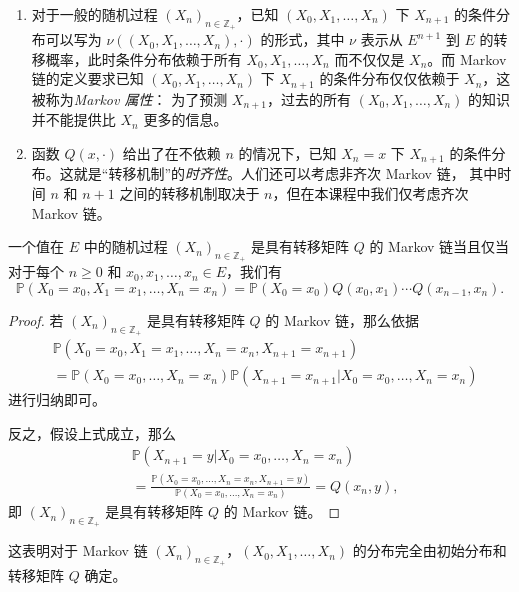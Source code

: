 \documentclass[fontset=none]{Notes}
\begin{document}
\begin{remark}
  \mbox{}
  \begin{enumerate}
    \item 对于一般的随机过程 $(X_n)_{n\in \mathbb{Z}_+}$，已知 $(X_0,X_1,\dots,X_n)$
    下 $X_{n+1}$ 的条件分布可以写为 $\nu((X_0,X_1,\dots,X_n),\cdot)$ 的形式，其中
    $\nu$ 表示从 $E^{n+1}$ 到 $E$ 的转移概率，此时条件分布依赖于所有 $X_0,X_1,\dots,X_n$
    而不仅仅是 $X_n$。而 Markov 链的定义要求已知 $(X_0,X_1,\dots,X_n)$
    下 $X_{n+1}$ 的条件分布仅仅依赖于 $X_n$，这被称为\emph{Markov 属性}：
    为了预测 $X_{n+1}$，过去的所有 $(X_0,X_1,\dots,X_n)$ 的知识并不能提供比 $X_n$
    更多的信息。  
    \item 函数 $Q(x,\cdot)$ 给出了在不依赖 $n$ 的情况下，已知 $X_n=x$ 下 $X_{n+1}$
    的条件分布。这就是“转移机制”的\emph{时齐性}。人们还可以考虑非齐次 Markov 链，
    其中时间 $n$ 和 $n + 1$ 之间的转移机制取决于 $n$，但在本课程中我们仅考虑齐次 Markov 链。
  \end{enumerate}
\end{remark}

\begin{proposition}\label{prop:law of X0 to Xn}
  一个值在 $E$ 中的随机过程 $(X_n)_{n\in \mathbb{Z}_+}$ 是具有转移矩阵 $Q$ 的 Markov 链当且仅当
  对于每个 $n\geq 0$ 和 $x_0,x_1,\dots,x_n\in E$，我们有
  \[
    \mathbb{P}(X_0=x_0,X_1=x_1,\dots,X_n=x_n)=\mathbb{P}(X_0=x_0)
    Q(x_0,x_1)\cdots Q(x_{n-1},x_n).
  \]
\end{proposition}
\begin{proof}
  若 $(X_n)_{n\in \mathbb{Z}_+}$ 是具有转移矩阵 $Q$ 的 Markov 链，那么依据
  \begin{align*}
    &\mathbb{P}(X_0=x_0,X_1=x_1,\dots,X_n=x_n,X_{n+1}=x_{n+1})\\
    &=\mathbb{P}(X_0=x_0,\dots,X_n=x_n)\mathbb{P}(X_{n+1}=x_{n+1}|X_0=x_0,\dots,X_n=x_n)
  \end{align*}
  进行归纳即可。

  反之，假设上式成立，那么
  \begin{align*}
    &\mathbb{P}(X_{n+1}=y|X_0=x_0,\dots,X_n=x_n)\\
    &=\frac{\mathbb{P}(X_0=x_0,\dots,X_n=x_n,X_{n+1}=y)}{\mathbb{P}(X_0=x_0,\dots,X_n=x_n)}
    =Q(x_n,y),
  \end{align*}
  即 $(X_n)_{n\in \mathbb{Z}_+}$ 是具有转移矩阵 $Q$ 的 Markov 链。
\end{proof}

\begin{remark}
  这表明对于 Markov 链 $(X_n)_{n\in \mathbb{Z}_+}$，$(X_0,X_1,\dots,X_n)$
  的分布完全由初始分布和转移矩阵 $Q$ 确定。
\end{remark}
\end{document}

